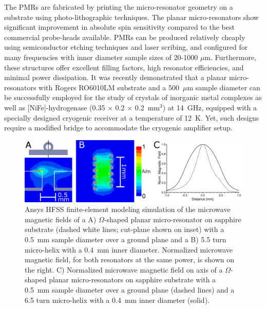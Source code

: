 The PMRs are fabricated by printing the micro-resonator geometry on a substrate using photo-lithographic techniques. \cite{Suter2005, Suter2008, suter2015} The planar micro-resonators show significant improvement in absolute spin sensitivity compared to the best commercial probe-heads available. \cite{ ReijerseSavitsky2017} PMRs can be produced relatively cheaply using semiconductor etching techniques and laser scribing, and configured for many frequencies with inner diameter sample sizes of 20-1000 $\mu$m. Furthermore, these structures offer excellent filling factors, high resonator efficiencies, and minimal power dissipation. It was recently demonstrated that a planar micro-resonators with Rogers RO6010LM substrate and a 500~$\mu$m sample diameter can be successfully employed for the study of crystals of inorganic metal complexes as well as [NiFe]-hydrogenase (0.35 $\times$ 0.2 $\times$ 0.2~mm$^3$) at 14~GHz, equipped with a specially designed cryogenic receiver at a temperature of 12~K. \cite{NARKOWICZ201379} Yet, such designs require a modified bridge to accommodate the cryogenic amplifier setup.

\begin{figure}[htbp]
\centering
 \includegraphics[width=\textwidth]{Kapitel/Ch4-Images/02-PMRCompare_OnAxis.eps}
 \caption[Ansys HFSS magnetic field simulation: PMR and micro-helix.]{Ansys HFSS finite-element modeling simulation of the microwave magnetic fields of a A) $\Omega$-shaped planar micro-resonator on sapphire substrate (dashed white lines; cut-plane shown on inset) with a 0.5~mm sample diameter over a ground plane and a B) 5.5 turn micro-helix with a 0.4~mm inner diameter. Normalized microwave magnetic field, for both resonators at the same power, is shown on the right. C) Normalized microwave magnetic field on axis of a $\Omega$-shaped planar micro-resonators on sapphire substrate with a 0.5~mm sample diameter over a ground plane (dashed lines) and a 6.5 turn micro-helix with a 0.4~mm inner diameter (solid).}
 \label{fig:HFSS}
\end{figure}

